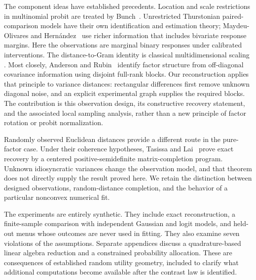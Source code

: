 \documentclass[11pt]{amsart}
\theoremstyle{definition}\newtheorem{example}[theorem]{Example}
\theoremstyle{remark}\newtheorem{remark}[theorem]{Remark}
\begin{document}
The component ideas have established precedents. Location and scale restrictions in multinomial probit are treated by Bunch~\cite{bunch1991}. Unrestricted Thurstonian paired-comparison models have their own identification and estimation theory; Maydeu-Olivares and Hern\'andez~\cite{maydeu2007} use richer information that includes bivariate response margins. Here the observations are marginal binary responses under calibrated interventions. The distance-to-Gram identity is classical multidimensional scaling \cite{gower1966}. Most closely, Anderson and Rubin~\cite[Theorem~5.1]{anderson1956} identify factor structure from off-diagonal covariance information using disjoint full-rank blocks. Our reconstruction applies that principle to variance distances: rectangular differences first remove unknown diagonal noise, and an explicit experimental graph supplies the required blocks. The contribution is this observation design, its constructive recovery statement, and the associated local sampling analysis, rather than a new principle of factor rotation or probit normalization.

Randomly observed Euclidean distances provide a different route in the pure-factor case. Under their coherence hypotheses, Tasissa and Lai~\cite{tasissa2019} prove exact recovery by a centered positive-semidefinite matrix-completion program. Unknown idiosyncratic variances change the observation model, and that theorem does not directly supply the result proved here. We retain the distinction between designed observations, random-distance completion, and the behavior of a particular nonconvex numerical fit.

The experiments are entirely synthetic. They include exact reconstruction, a finite-sample comparison with independent Gaussian and logit models, and held-out menus whose outcomes are never used in fitting. They also examine seven violations of the assumptions. Separate appendices discuss a quadrature-based linear algebra reduction and a constrained probability allocation. These are consequences of established random utility geometry, included to clarify what additional computations become available after the contrast law is identified.
\end{document}
